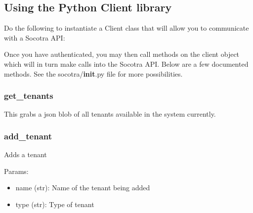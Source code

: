 \hypertarget{using-the-python-client-library}{%
\subsection{Using the Python Client
library}\label{using-the-python-client-library}}

Do the following to instantiate a Client class that will allow you to
communicate with a Socotra API:

\begin{Shaded}
\begin{Highlighting}[]
\OperatorTok{=}\NormalTok{)}
\end{Highlighting}
\end{Shaded}

Once you have authenticated, you may then call methods on the client
object which will in turn make calls into the Socotra API. Below are a
few documented methods. See the socotra/\textbf{init}.py file for more
possibilities.

\hypertarget{get_tenants}{%
\subsubsection{get\_tenants}\label{get_tenants}}

This grabs a json blob of all tenants available in the system currently.

\begin{Shaded}
\begin{Highlighting}[]
\OperatorTok{=}
\end{Highlighting}
\end{Shaded}

\hypertarget{add_tenant}{%
\subsubsection{add\_tenant}\label{add_tenant}}

Adds a tenant

Params:

\begin{itemize}
\tightlist
\item
  name (str): Name of the tenant being added
\item
  type (str): Type of tenant
\end{itemize}

